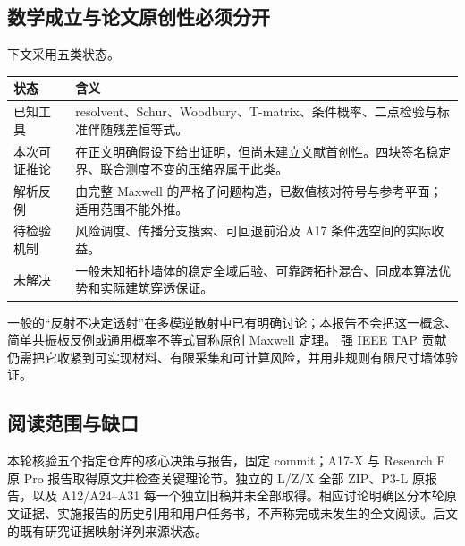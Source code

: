 \subsection{数学成立与论文原创性必须分开}
下文采用五类状态。
\begin{longtable}{p{27mm}p{121mm}}
\toprule
状态 & 含义\\
\midrule
已知工具 & resolvent、Schur、Woodbury、T-matrix、条件概率、二点检验与标准伴随残差恒等式。\\
本次可证推论 & 在正文明确假设下给出证明，但尚未建立文献首创性。四块签名稳定界、联合测度不变的压缩界属于此类。\\
解析反例 & 由完整 Maxwell 的严格子问题构造，已数值核对符号与参考平面；适用范围不能外推。\\
待检验机制 & 风险调度、传播分支搜索、可回退前沿及 A17 条件选空间的实际收益。\\
未解决 & 一般未知拓扑墙体的稳定全域后验、可靠跨拓扑混合、同成本算法优势和实际建筑穿透保证。\\
\bottomrule
\end{longtable}

一般的“反射不决定透射”在多模逆散射中已有明确讨论；本报告不会把这一概念、简单共振板反例或通用概率不等式冒称原创 Maxwell 定理。\cite{L_Waagaard} 强 IEEE TAP 贡献仍需把它收紧到可实现材料、有限采集和可计算风险，并用非规则有限尺寸墙体验证。

\subsection{阅读范围与缺口}
本轮核验五个指定仓库的核心决策与报告，固定 commit；A17-X 与 Research F 原 Pro 报告取得原文并检查关键理论节。独立的 L/Z/X 全部 ZIP、P3-L 原报告，以及 A12/A24--A31 每一个独立旧稿并未全部取得。相应讨论明确区分本轮原文证据、实施报告的历史引用和用户任务书，不声称完成未发生的全文阅读。后文的既有研究证据映射详列来源状态。

